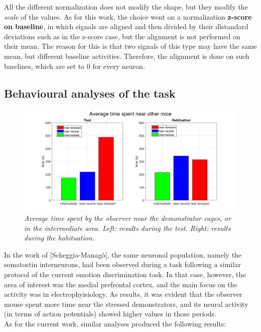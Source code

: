 \documentclass[a4paper]{article}
\begin{document}
	
	All the different normalization does not modify the shape, but they modify the \textit{scale} of the values. As for this work, the choice went on a normalization \textbf{z-score on baseline}, in which signals are aligned and then divided by their dìstandard deviations such as in the z-score case, but the alignment is not performed on their mean. The reason for this is that two signals of this type may have the same mean, but different baseline activities. Therefore, the alignment is done on such baselines, which are set to $0$ for every neuron.
	
	
	
	\subsection{Behavioural analyses of the task}
	
	
	\begin{figure}[H]
		
		\centering
			
			\hspace*{-1.4 cm}
			\includegraphics[scale=.42]{times.png} 
		\caption{\textit{Average time spent by the observer near the demonstrator cages, or in the intermediate area. Left: results during the test. Right: results during the habituation. }}
		
	\end{figure}
	
In the work of [Scheggia-Managò], the same neuronal population, namely the somatostin interneurons, had been observed during a task following a similar protocol of the current emotion discrimination task. In that case, however, the area of interest was the medial prefrontal cortex, and the main focus on the activity was in electrophyisiology. As results, it was evident that the observer mouse spent more time near the stressed demonstrators, and its neural activity (in terms of action potentials) showed higher values in those periods.\\
As for the current work, similar analyses produced the following results:
\end{document}
